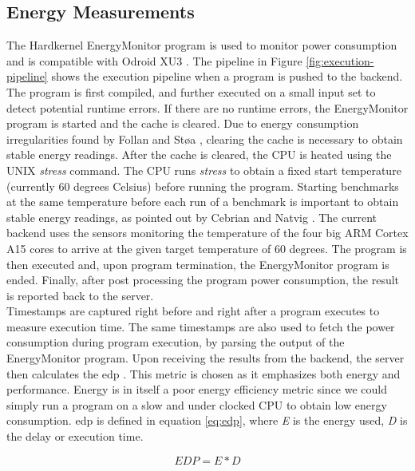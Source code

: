 \subsection{Energy Measurements}
\label{sec:em-cmb}
The Hardkernel EnergyMonitor program is used to monitor power consumption and is compatible with Odroid XU3 \cite{OEM}. The pipeline in Figure \ref{fig:execution-pipeline} shows the execution pipeline when a program is pushed to the backend. The program is first compiled, and further executed on a small input set to detect potential runtime errors. If there are no runtime errors, the EnergyMonitor program is started and the cache is cleared. Due to energy consumption irregularities found by Follan and Støa \cite{mt:T&S}, clearing the cache is necessary to obtain stable energy readings. After the cache is cleared, the CPU is heated using the UNIX \textit{stress} \cite{STRESS} command. The CPU runs \textit{stress} to obtain a fixed start temperature (currently 60 degrees Celsius) before running the program. Starting benchmarks at the same temperature before each run of a benchmark is important to obtain stable energy readings, as pointed out by Cebrian and Natvig \cite{a:JL:T}. The current backend uses the sensors monitoring the temperature of the four big ARM Cortex A15 cores to arrive at the given target temperature of 60 degrees. The program is then executed and, upon program termination, the EnergyMonitor program is ended. Finally, after post processing the program power consumption, the result is reported back to the server. \\

Timestamps are captured right before and right after a program executes to measure execution time. The same timestamps are also used to fetch the power consumption during program execution, by parsing the output of the EnergyMonitor program. Upon receiving the results from the backend, the server then calculates the \gls{edp} \cite{a:edp}. This metric is chosen as it emphasizes both energy and performance. Energy is in itself a poor energy efficiency metric since we could simply run a program on a slow and under clocked CPU to obtain low energy consumption. \gls{edp} is defined in equation \ref{eq:edp}, where \textit{E} is the energy used, \textit{D} is the delay or execution time.

\begin{equation}
  \label{eq:edp}
  EDP = E * D
\end{equation}

